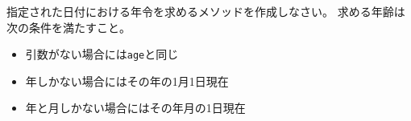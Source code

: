 \begin{Prob}\upshape
 指定された日付における年令を求めるメソッドを作成しなさい。
 求める年齢は次の条件を満たすこと。
 \begin{itemize}
  \item 引数がない場合には\texttt{age}と同じ
  \item 年しかない場合にはその年の1月1日現在
  \item 年と月しかない場合にはその年月の1日現在
 \end{itemize}
\end{Prob}

